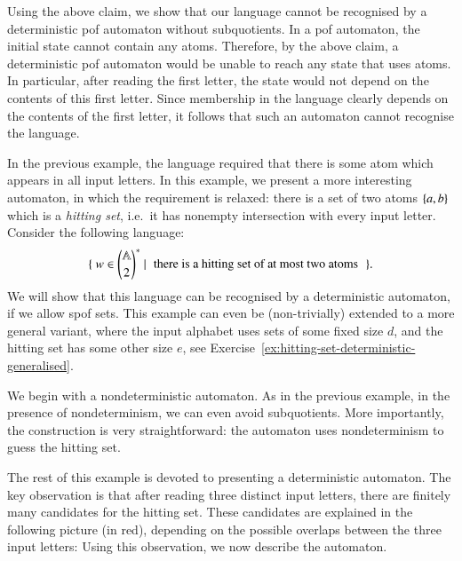 \begin{myexample}
    Using the above claim, we show that our language cannot be recognised by a deterministic pof automaton without subquotients.
    In a pof automaton, the initial state cannot contain any atoms. Therefore, by the above claim, a deterministic pof automaton would be unable to reach any state that uses atoms. In particular, after reading the first letter, the state would not depend on the contents of this first letter. Since membership in the language clearly depends on the contents of the first letter, it follows that such an automaton cannot recognise the language. 
\end{myexample}

\begin{myexample}\label{ex:hitting-set}
    In the previous example, the language required that there is some atom which appears in all input letters. In this example, we present a more interesting automaton, in which the requirement is relaxed: there is a set of two atoms $\{a,b\}$ which is a \emph{hitting set}, i.e.~it has nonempty intersection with every input letter.  Consider the following  language:
    \begin{align*}
    \setbuild{w \in {\atoms \choose 2}^*}{there is a hitting  set of at most two atoms}.
    \end{align*}
    We will show that this language can be recognised by a deterministic automaton, if we allow spof sets. This example can even be (non-trivially) extended to a more general variant, where the input alphabet uses sets of some fixed size $d$, and the hitting set has some other size $e$, see Exercise~\ref{ex:hitting-set-deterministic-generalised}.

    We begin with a nondeterministic automaton. As in the previous example, in the presence of nondeterminism, we can even avoid subquotients. More importantly, the construction is very straightforward: the automaton uses nondeterminism to guess the hitting set. 
    
    The rest of this example is devoted to presenting a deterministic automaton.  The key observation is that after reading three distinct input letters, there are finitely many candidates for the hitting set. These candidates are explained in the following picture (in red), depending on the possible overlaps between the three input letters:
    Using this observation, we now describe the automaton. 
    

\end{myexample}
